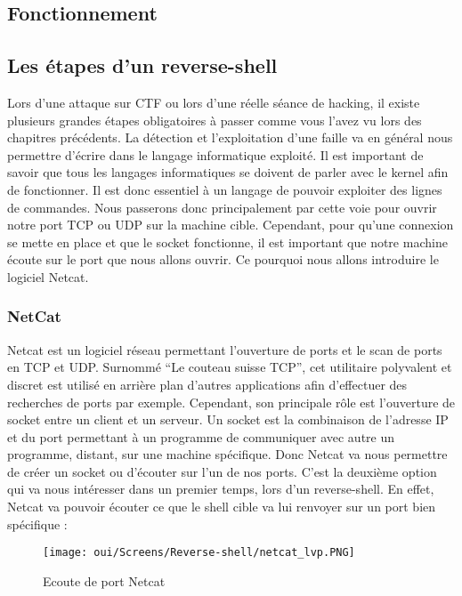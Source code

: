 \subsection{Fonctionnement}

\subsection{Les étapes d'un reverse-shell}

Lors d’une attaque sur CTF ou lors d’une réelle séance de hacking, il existe plusieurs grandes étapes obligatoires à passer comme vous l’avez vu lors des chapitres précédents. La détection et l’exploitation d’une faille va en général nous permettre d’écrire dans le langage informatique exploité. Il est important de savoir que tous les langages informatiques se doivent de parler avec le kernel afin de fonctionner. Il est donc essentiel  à un langage de pouvoir exploiter des lignes de commandes. Nous passerons donc principalement par cette voie pour ouvrir notre port TCP ou UDP sur la machine cible. Cependant, pour qu’une connexion se mette en place et que le socket fonctionne, il est important que notre machine écoute sur le port que nous allons ouvrir. Ce pourquoi nous allons introduire le logiciel Netcat.

\subsubsection{NetCat}

Netcat est un logiciel réseau permettant l’ouverture de ports et le scan de ports en TCP et UDP. Surnommé “Le couteau suisse TCP”,  cet utilitaire polyvalent et discret est utilisé en arrière plan d’autres applications afin d’effectuer des recherches de ports par exemple. Cependant, son  principale rôle est l’ouverture de socket entre un client et un serveur.
Un socket est la combinaison de l’adresse IP et du port permettant à un programme de communiquer avec autre un programme, distant, sur une machine spécifique. 
Donc Netcat va nous permettre de créer un socket ou d’écouter sur l’un de nos ports. C’est la deuxième option qui va nous intéresser dans un premier temps, lors d’un reverse-shell. En effet, Netcat va pouvoir écouter ce que le shell cible va lui renvoyer sur un port bien spécifique :

\begin{figure}[htp!]
  \centering
  \setlength\figureheight{7cm}
  \setlength\figurewidth{9cm}
  \texttt{[image: oui/Screens/Reverse-shell/netcat\_lvp.PNG]}
  \caption{Ecoute de port Netcat}
  \label{fig:courbe-tikz}
\end{figure}

